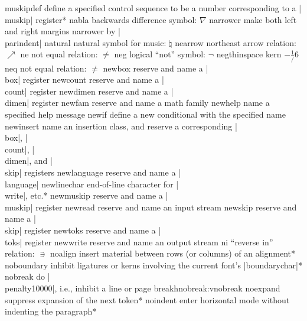 \capcs muskipdef {define a specified control sequence to be a number
   corresponding to a |\\muskip| register}*{}
\capcs nabla {backwards difference symbol: $\nabla$}{}{}
\capcs narrower {make both left and right margins narrower by
   |\\parindent|}{}{}
\capcs natural {natural symbol for music: $\natural$}{}{}
\capcs nearrow {northeast arrow relation: $\nearrow$}{}{}
\capcs ne {not equal relation: $\ne$}{}{}
\capcs neg {logical ``not'' symbol: $\neg$}{}{}
\capcs negthinspace {kern $-\frac1/6$\em}{}{}
\capcs neq {not equal relation: $\neq$}{}{}
\capcs newbox {reserve and name a |\\box| register}{}{\@newbox}
\capcs newcount {reserve and name a |\\count| register}{}{\@newcount}
\capcs newdimen {reserve and name a |\\dimen| register}{}{\@newdimen}
\capcs newfam {reserve and name a math family}{}{\@newfam}
\capcs newhelp {name a specified help message}{}{\@newhelp}
\capcs newif {define a new conditional with the specified name}{}{\@newif}
\capcs newinsert {name an insertion class, and reserve a
   corresponding |\\box|, |\\count|, |\\dimen|, and |\\skip| registers}
   {}{\@newinsert}
\capcs newlanguage {reserve and name a |\\language|}{}{\@newlanguage}
\capcs newlinechar {end-of-line character for |\\write|, etc.}*{}
\capcs newmuskip {reserve and name a |\\muskip| register}{}{\@newmuskip}
\capcs newread {reserve and name an input stream}{}{\@newread}
\capcs newskip {reserve and name a |\\skip| register}{}{\@newskip}
\capcs newtoks {reserve and name a |\\toks| register}{}{\@newtoks}
\capcs newwrite {reserve and name an output stream}{}{\@newwrite}
\capcs ni {``reverse in'' relation: $\ni$}{}{}
\capcs noalign {insert material between rows (or columns) of an
   alignment}*{}
\capcs noboundary {inhibit ligatures or kerns involving the current font's
   |boundarychar|}*{}
\capcstwo nobreak {do |\\penalty10000|, i.e.,
   inhibit a line or page break}{}{hnobreak:vnobreak}
\capcs noexpand {suppress expansion of the next token}*{}
\capcs noindent {enter horizontal mode without indenting the paragraph}*{}

